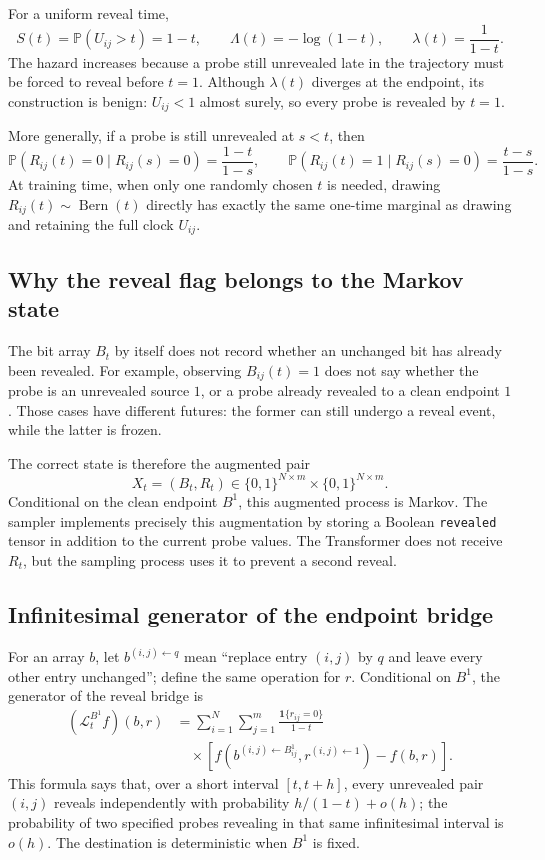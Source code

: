 \documentclass[11pt]{article}
\newcommand{\Pp}{\mathbb{P}}
\newcommand{\Ber}{\operatorname{Bern}}
\newcommand{\1}{\mathbf{1}}
\newcommand{\code}[1]{\texttt{#1}}
\begin{document}
For a uniform reveal time,
\[
  S(t)=\Pp(U_{ij}>t)=1-t,\qquad
  \Lambda(t)=-\log(1-t),\qquad
  \boxed{\lambda(t)=\frac{1}{1-t}}.
\]
The hazard increases because a probe still unrevealed late in the trajectory
must be forced to reveal before \(t=1\).  Although \(\lambda(t)\) diverges at
the endpoint, its construction is benign: \(U_{ij}<1\) almost surely, so every
probe is revealed by \(t=1\).

More generally, if a probe is still unrevealed at \(s<t\), then
\[
  \Pp(R_{ij}(t)=0\mid R_{ij}(s)=0)=\frac{1-t}{1-s},
  \qquad
  \Pp(R_{ij}(t)=1\mid R_{ij}(s)=0)=\frac{t-s}{1-s}.
\]
At training time, when only one randomly chosen \(t\) is needed, drawing
\(R_{ij}(t)\sim\Ber(t)\) directly has exactly the same one-time marginal as
drawing and retaining the full clock \(U_{ij}\).

\subsection{Why the reveal flag belongs to the Markov state}

The bit array \(B_t\) by itself does not record whether an unchanged bit has
already been revealed.  For example, observing \(B_{ij}(t)=1\) does not say
whether the probe is an unrevealed source \(1\), or a probe already revealed
to a clean endpoint \(1\).  Those cases have different futures: the former
can still undergo a reveal event, while the latter is frozen.

The correct state is therefore the augmented pair
\[
  X_t=(B_t,R_t)\in
  \{0,1\}^{N\times m}\times\{0,1\}^{N\times m}.
\]
Conditional on the clean endpoint \(B^1\), this augmented process is Markov.
The sampler implements precisely this augmentation by storing a Boolean
\code{revealed} tensor in addition to the current probe values.  The
Transformer does not receive \(R_t\), but the sampling process uses it to
prevent a second reveal.

\subsection{Infinitesimal generator of the endpoint bridge}

For an array \(b\), let \(b^{(i,j)\leftarrow q}\) mean ``replace entry
\((i,j)\) by \(q\) and leave every other entry unchanged''; define the same
operation for \(r\).  Conditional on \(B^1\), the generator of the reveal
bridge is
\[
\begin{aligned}
(\mathcal L_t^{B^1}f)(b,r)
&=
\sum_{i=1}^{N}\sum_{j=1}^{m}
\frac{\1\{r_{ij}=0\}}{1-t}\\
&\quad\times
\left[
 f\!\left(
 b^{(i,j)\leftarrow B^1_{ij}},
 r^{(i,j)\leftarrow1}
 \right)-f(b,r)
\right].
\end{aligned}
\]
This formula says that, over a short interval \([t,t+h]\), every unrevealed
pair \((i,j)\) reveals independently with probability
\(h/(1-t)+o(h)\); the probability of two specified probes revealing in that
same infinitesimal interval is \(o(h)\).  The destination is deterministic
when \(B^1\) is fixed.
\end{document}
